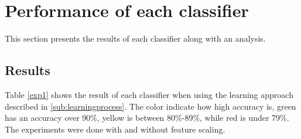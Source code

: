 \documentclass[USenglish]{ifimaster}  %
\begin{document}
 
\section{Performance of each classifier}\label{result_exp1}
This section presents the results of each classifier along with an analysis.
	
\subsection{Results}
Table \ref{exp1} shows the result of each classifier when using the learning approach described in \ref{sub:learningprocess}. The color indicate how high accuracy is, green has an accuracy over 90\%, yellow is between 80\%-89\%, while red is under 79\%. The experiments were done with and without feature scaling.  
\end{document}
